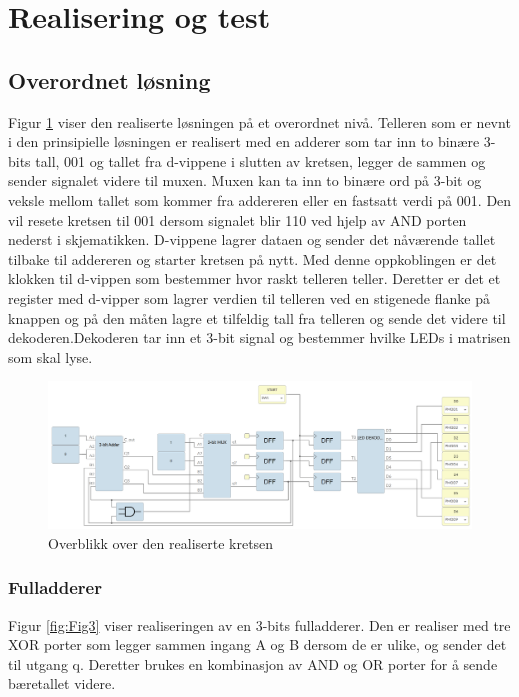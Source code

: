 \clearpage
\section{Realisering og test}
\label{realiseringOgTest}

\subsection[Overordnet]{Overordnet løsning}

Figur \ref{fig:Fig2} viser den realiserte løsningen på et overordnet nivå. Telleren som er nevnt i den prinsipielle løsningen er realisert med en adderer som tar inn to binære 3-bits tall, 001 og tallet fra d-vippene i slutten av kretsen, legger de sammen og sender signalet videre til muxen. Muxen kan ta inn to binære ord på 3-bit og veksle mellom tallet som kommer fra addereren eller en fastsatt verdi på 001. Den vil resete kretsen til 001 dersom signalet blir 110 ved hjelp av AND porten nederst i skjematikken. D-vippene lagrer dataen og sender det nåværende tallet tilbake til addereren og starter kretsen på nytt. Med denne oppkoblingen er det klokken til d-vippen som bestemmer hvor raskt telleren teller. Deretter er det et register med d-vipper som lagrer verdien til telleren ved en stigenede flanke på knappen og på den måten lagre et tilfeldig tall fra telleren og sende det videre til dekoderen.Dekoderen tar inn et 3-bit signal og bestemmer hvilke LEDs i matrisen som skal lyse.

\begin{figure}[!h]
  \centering
  \includegraphics[width=1\textwidth]{Bilder/Realisert.png} 
  \caption{Overblikk over den realiserte kretsen}
  \label{fig:Fig2}
\end{figure}

\subsubsection[Adderer]{Fulladderer}
Figur \ref{fig:Fig3} viser realiseringen av en 3-bits fulladderer. Den er realiser med tre XOR porter som legger sammen ingang A og B dersom de er ulike, og sender det til utgang q. Deretter brukes en kombinasjon av AND og OR porter for å sende bæretallet videre. 

